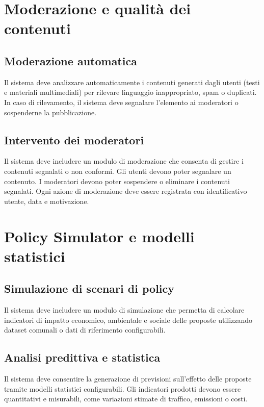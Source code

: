 \section{Moderazione e qualità dei contenuti}

\subsection{Moderazione automatica}
Il sistema deve analizzare automaticamente i contenuti generati dagli utenti (testi e materiali multimediali) per rilevare linguaggio inappropriato, spam o duplicati.  
In caso di rilevamento, il sistema deve
segnalare l’elemento ai moderatori o sospenderne la pubblicazione.

\subsection{Intervento dei moderatori}
Il sistema deve includere un modulo di moderazione che consenta di gestire i contenuti segnalati o non conformi.  
Gli utenti devono poter segnalare un contenuto.  
I moderatori devono poter sospendere o eliminare i contenuti segnalati.  
Ogni azione di moderazione deve essere registrata con identificativo utente, data e motivazione.

\section{Policy Simulator e modelli statistici}

\subsection{Simulazione di scenari di policy}
Il sistema deve includere un modulo di simulazione che permetta di calcolare indicatori di impatto economico, ambientale e sociale delle proposte utilizzando dataset comunali o dati di riferimento configurabili.  

\subsection{Analisi predittiva e statistica}
Il sistema deve consentire la generazione di previsioni sull’effetto delle proposte tramite modelli statistici configurabili.  
Gli indicatori prodotti devono essere quantitativi e misurabili, come variazioni stimate di traffico, emissioni o costi.

